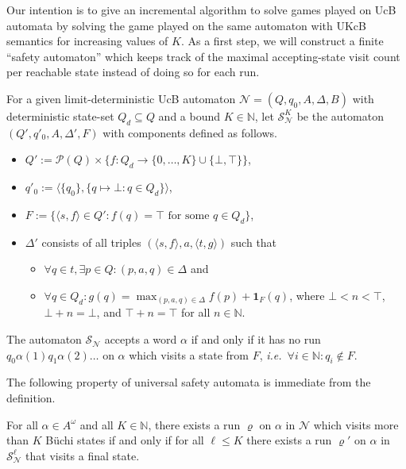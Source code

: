 \documentclass[draft]{llncs}
\let\rho\varrho
\newcommand{\indicator}[2]{\mathbf{1}_{#1}(#2)}
\newcommand{\pow}{\mathcal{P}}
\newcommand{\st}{\mathrel{:}}
\newcommand{\ie}{\textit{i.e.}\xspace}
\newcommand{\calN}{\mathcal{N}}
\newcommand{\calS}{\mathcal{S}}
\begin{document}
Our intention is to give an incremental algorithm to solve games played on UcB
automata by solving the game played on the same automaton with UKcB semantics
for increasing values of $K$. As a first step, we will construct a finite
``safety automaton'' which keeps track of the maximal accepting-state visit
count per reachable state instead of doing so for each run.
\begin{definition}
    For a given limit-deterministic UcB automaton $\calN = (Q,q_0,A,\Delta,B)$
    with deterministic state-set $Q_d \subseteq Q$ and a bound $K \in
    \mathbb{N}$, let $\calS^K_\calN$ be the automaton $(Q',q'_0,A,\Delta',F)$ with
    components defined as follows.
    \begin{itemize}
        \item $Q' := \pow(Q) \times \{f : Q_d \to \{0,\dots,K\} \cup
            \{\bot,\top\}\}$,
        \item $q'_0 := \langle \{q_0\}, \{ q \mapsto \bot \st q \in Q_d\}
            \rangle$,
        \item $F := \{ \langle s, f \rangle \in Q' \st f(q) = \top \text{ for
            some } q \in Q_d \}$,
        \item $\Delta'$ consists of all triples 
            $(\langle s, f \rangle, a, \langle t, g \rangle)$ such that
            \begin{itemize}
                \item $\forall q \in t, \exists p \in Q : (p,a,q) \in \Delta$ and
                \item $\forall q \in Q_d :
                        g(q) = \max_{(p,a,q) \in \Delta}
                        f(p) + \indicator{F}{q}$,
                    where $\bot < n < \top$, $\bot + n = \bot$, and $\top + n =
                    \top$ for all $n \in \mathbb{N}$.
            \end{itemize}
    \end{itemize}
    The automaton $\calS_\calN$ accepts a word $\alpha$ if and only if it has no
    run $q_0 \alpha(1) q_1 \alpha(2) \dots$ on $\alpha$ which visits a
    state from $F$, \ie~$\forall i \in \mathbb{N} : q_i \not\in F$.
\end{definition}

The following property of universal safety automata is immediate from the
definition.
\begin{lemma}
    For all $\alpha \in A^\omega$ and all $K \in \mathbb{N}$, there exists a
    run $\rho$ on $\alpha$ in $\calN$ which visits more than $K$ B\"uchi states
    if and only if for all $\ell \le K$ there exists a run $\rho'$ on $\alpha$ in
    $\calS^\ell_\calN$ that visits a final state.
\end{lemma}
\end{document}
